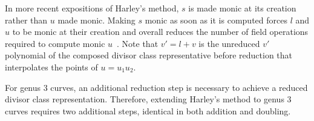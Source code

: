 \begin{figure}[ht]
\noindent{}
\end{figure}

In more recent expositions of Harley's method, $s$ is made monic at its creation
rather than $u$ made monic. Making $s$ monic as soon as it is computed forces
$l$ and $u$ to be monic at their creation and overall reduces the number of
field operations required to compute monic $u$~\cite{Lange_explicit_2005}. Note
that $v' = l+v$ is the unreduced $v'$ polynomial of the composed divisor class
representative before reduction that interpolates the points of $u = u_1u_2$.

For genus 3 curves, an additional reduction step is necessary to achieve a
reduced divisor class representation. Therefore, extending Harley's method to
genus 3 curves requires two additional steps, identical in both addition and
doubling.

